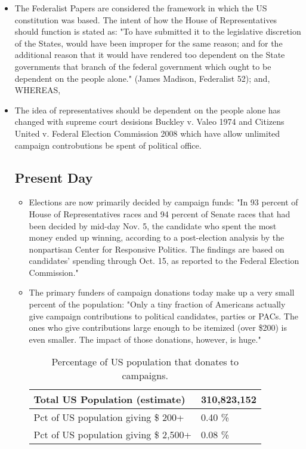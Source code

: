 \documentclass[11pt]{article} %
\begin{document}
\begin{itemize}

\item  The Federalist Papers are considered the framework in which the US constitution was based.   The intent of how the House of Representatives should function is stated as: "To have submitted it to the legislative discretion of the States, would have been improper for the same reason; and for the additional reason that it would have rendered too dependent on the State governments that branch of the federal government which ought to be dependent on the people alone." (James Madison, Federalist 52); and,
WHEREAS,

\item The idea of representatives should be dependent on the people alone has changed with supreme court desisions Buckley v. Valeo 1974 and Citizens United v. Federal Election Commission 2008 which have allow unlimited campaign controbutions be spent of political office. 

\subsection{Present Day}

\begin{itemize}

\item Elections are now primarily decided by campaign funds: "In 93 percent of House of Representatives races and 94 percent of Senate races that had been decided by mid-day Nov. 5, the candidate who spent the most money ended up winning, according to a post-election analysis by the nonpartisan Center for Responsive Politics. The findings are based on candidates' spending through Oct. 15, as reported to the Federal Election Commission." ~\cite{OpenSecretsWins}

\item The primary funders of campaign donations today make up a very small percent of the population: "Only a tiny fraction of Americans actually give campaign contributions to political candidates, parties or PACs. The ones who give contributions large enough to be itemized (over \$200) is even smaller. The impact of those donations, however, is huge."~\cite{OpenSecretsDemographics13}  


\begin{table}
    \begin{tabular}{|l|l|}
        \hline
        Total US Population (estimate)     & 310,823,152 \\ \hline
        Pct of US population giving \$ 200+   & 0.40 \%     \\ 
        Pct of US population giving \$ 2,500+ &  0.08   \%   \\
        \hline
    \end{tabular}
 \caption{Percentage of US population that donates to campaigns. }
\end{table}


\end{itemize}
\end{itemize}
\end{document}
